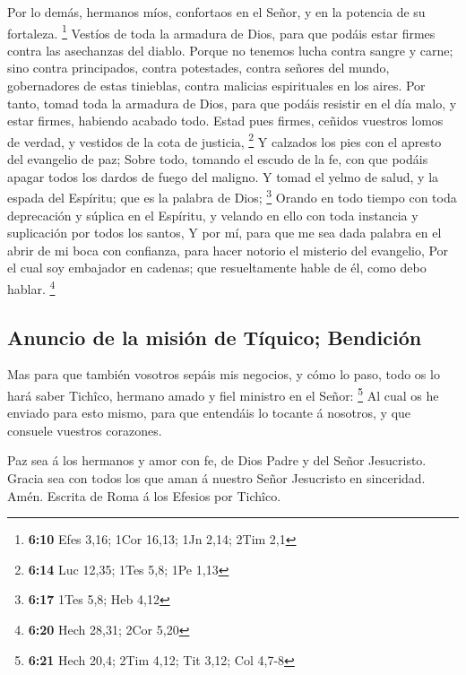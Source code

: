  Por lo demás, hermanos míos, confortaos en el Señor, y en
la potencia de su fortaleza. \footnote{\textbf{6:10} Efes 3,16; 1Cor
  16,13; 1Jn 2,14; 2Tim 2,1}  Vestíos de toda la armadura
de Dios, para que podáis estar firmes contra las asechanzas del diablo.
 Porque no tenemos lucha contra sangre y carne; sino contra
principados, contra potestades, contra señores del mundo, gobernadores
de estas tinieblas, contra malicias espirituales en los aires.
 Por tanto, tomad toda la armadura de Dios, para que podáis
resistir en el día malo, y estar firmes, habiendo acabado todo.
 Estad pues firmes, ceñidos vuestros lomos de verdad, y
vestidos de la cota de justicia, \footnote{\textbf{6:14} Luc 12,35; 1Tes
  5,8; 1Pe 1,13}  Y calzados los pies con el apresto del
evangelio de paz;  Sobre todo, tomando el escudo de la fe,
con que podáis apagar todos los dardos de fuego del maligno.
 Y tomad el yelmo de salud, y la espada del Espíritu; que
es la palabra de Dios; \footnote{\textbf{6:17} 1Tes 5,8; Heb 4,12}
 Orando en todo tiempo con toda deprecación y súplica en el
Espíritu, y velando en ello con toda instancia y suplicación por todos
los santos,  Y por mí, para que me sea dada palabra en el
abrir de mi boca con confianza, para hacer notorio el misterio del
evangelio,  Por el cual soy embajador en cadenas; que
resueltamente hable de él, como debo hablar. \footnote{\textbf{6:20}
  Hech 28,31; 2Cor 5,20}

\hypertarget{anuncio-de-la-misiuxf3n-de-tuxedquico-bendiciuxf3n}{%
\subsection{Anuncio de la misión de Tíquico;
Bendición}\label{anuncio-de-la-misiuxf3n-de-tuxedquico-bendiciuxf3n}}

 Mas para que también vosotros sepáis mis negocios, y cómo
lo paso, todo os lo hará saber Tichîco, hermano amado y fiel ministro en
el Señor: \footnote{\textbf{6:21} Hech 20,4; 2Tim 4,12; Tit 3,12; Col
  4,7-8}  Al cual os he enviado para esto mismo, para que
entendáis lo tocante á nosotros, y que consuele vuestros corazones.

 Paz sea á los hermanos y amor con fe, de Dios Padre y del
Señor Jesucristo.  Gracia sea con todos los que aman á
nuestro Señor Jesucristo en sinceridad. Amén. Escrita de Roma á los
Efesios por Tichîco.
